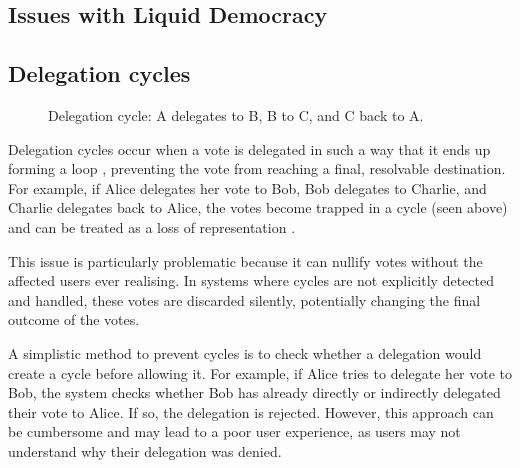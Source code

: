 
\subsection{Issues with Liquid Democracy}

\subsection*{Delegation cycles}
\begin{figure}[h]
    \centering
    \caption{Delegation cycle: A delegates to B, B to C, and C back to A.}
    \label{fig:triangle-cycle}
\end{figure}


Delegation cycles occur when a vote is delegated in such a way that it ends up forming a loop \citep{brill_liquid_2022}, preventing the vote from reaching a final, resolvable destination. For example, if Alice delegates her vote to Bob, Bob delegates to Charlie, and Charlie delegates back to Alice, the votes become trapped in a cycle (seen above) and can be treated as a loss of representation \citep{christoff2017liquiddemocracyanalysisbinary}.

This issue is particularly problematic because it can nullify votes without the affected users ever realising. In systems where cycles are not explicitly detected and handled, these votes are discarded silently, potentially changing the final outcome of the votes.

A simplistic method to prevent cycles is to check whether a delegation would create a cycle before allowing it. For example, if Alice tries to delegate her vote to Bob, the system checks whether Bob has already directly or indirectly delegated their vote to Alice. If so, the delegation is rejected. However, this approach can be cumbersome and may lead to a poor user experience, as users may not understand why their delegation was denied.

